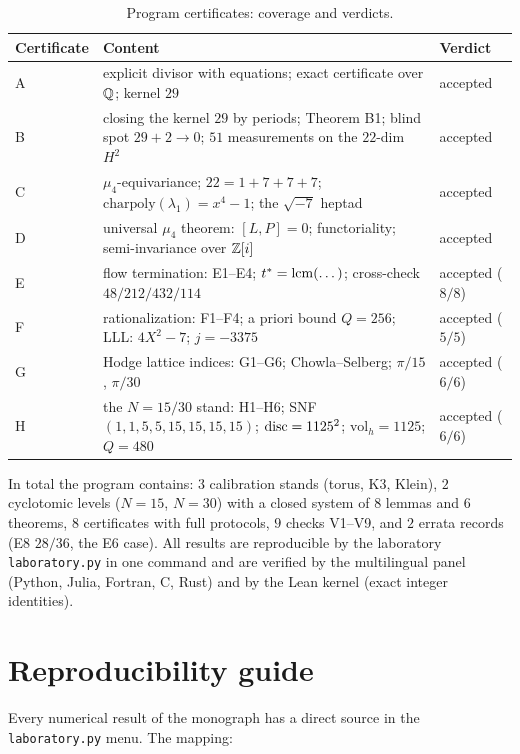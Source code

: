 \begin{table}[t]
\centering
\caption{Program certificates: coverage and verdicts.}
\label{tab:certs}
\small
\begin{tabularx}{\textwidth}{@{}l >{\raggedright\arraybackslash}X l@{}}
\toprule
Certificate & Content & Verdict \\
\midrule
A & explicit divisor with equations; exact certificate over $\mathbb{Q}$;
  kernel $29$ & accepted \\
B & closing the kernel $29$ by periods; Theorem B1; blind spot
  $29+2\to0$; $51$ measurements on the $22$-dim $H^2$ & accepted \\
C & $\mu_4$-equivariance; $22=1+7+7+7$;
  $\mathrm{charpoly}(\lambda_1)=x^4-1$; the $\sqrt{-7}$ heptad &
  accepted \\
D & universal $\mu_4$ theorem: $[L,P]=0$; functoriality;
  semi-invariance over $\mathbb{Z}[i]$ & accepted \\
E & flow termination: E1--E4; $t^*=\operatorname{lcm}(\dots)$; cross-check
  $48/212/432/114$ & accepted ($8/8$) \\
F & rationalization: F1--F4; a priori bound $Q=256$; LLL:
  $4X^2-7$; $j=-3375$ & accepted ($5/5$) \\
G & Hodge lattice indices: G1--G6; Chowla--Selberg; $\pi/15$,
  $\pi/30$ & accepted ($6/6$) \\
H & the $N=15/30$ stand: H1--H6; SNF $(1,1,5,5,15,15,15,15)$;
  $\operatorname{disc}=1125^2$; $\mathrm{vol}_h=1125$; $Q=480$ &
  accepted ($6/6$) \\
\bottomrule
\end{tabularx}
\end{table}

In total the program contains: $3$ calibration stands (torus, K3,
Klein), $2$ cyclotomic levels ($N=15$, $N=30$) with a closed system
of $8$ lemmas and $6$ theorems, $8$ certificates with full protocols,
$9$ checks V1--V9, and $2$ errata records (E8 $28/36$, the E6 case).
All results are reproducible by the laboratory \texttt{laboratory.py}
in one command and are verified by the multilingual panel (Python,
Julia, Fortran, C, Rust) and by the Lean kernel (exact integer
identities).

\section{Reproducibility guide}\label{sec:labmap}

Every numerical result of the monograph has a direct source in the
\texttt{laboratory.py} menu. The mapping:

